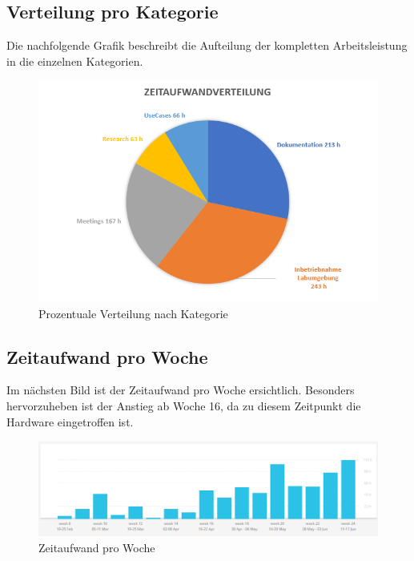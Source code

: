 \subsection{Verteilung pro Kategorie}
Die nachfolgende Grafik beschreibt die Aufteilung der kompletten Arbeitsleistung in die einzelnen Kategorien.
\begin{figure}[H]
	\centering
	\includegraphics[width=15cm]{img/zeitaufwand/zeitaufwandverteilung.PNG}
	\caption{Prozentuale Verteilung nach Kategorie}
	\label{fig:zeitmanagement-kategorie}
\end{figure} 

\subsection{Zeitaufwand pro Woche}
Im nächsten Bild ist der Zeitaufwand pro Woche ersichtlich. Besonders hervorzuheben ist der Anstieg ab Woche 16, da zu diesem Zeitpunkt die Hardware eingetroffen ist.
\begin{figure}[H]
	\centering
	\includegraphics[width=16cm]{img/zeitaufwand/zeitaufwand_monat.PNG}
	\caption{Zeitaufwand pro Woche}
	\label{fig:zeitmanagement-zeit}
\end{figure} 
